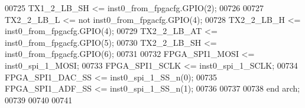 \begin{DoxyCode}
00725    \textcolor{vhdlchar}{TX1_2_LB_SH}       \textcolor{vhdlchar}{<=} \textcolor{vhdlchar}{inst0_from_fpgacfg}\textcolor{vhdlchar}{.}\textcolor{vhdlchar}{GPIO}\textcolor{vhdlchar}{(}\textcolor{vhdllogic}{}\textcolor{vhdllogic}{2}\textcolor{vhdlchar}{)};
00726    
00727    \textcolor{vhdlchar}{TX2_2_LB_L}        \textcolor{vhdlchar}{<=} \textcolor{keywordflow}{not} \textcolor{vhdlchar}{inst0_from_fpgacfg}\textcolor{vhdlchar}{.}\textcolor{vhdlchar}{GPIO}\textcolor{vhdlchar}{(}\textcolor{vhdllogic}{}\textcolor{vhdllogic}{4}\textcolor{vhdlchar}{)};
00728    \textcolor{vhdlchar}{TX2_2_LB_H}        \textcolor{vhdlchar}{<=} \textcolor{vhdlchar}{inst0_from_fpgacfg}\textcolor{vhdlchar}{.}\textcolor{vhdlchar}{GPIO}\textcolor{vhdlchar}{(}\textcolor{vhdllogic}{}\textcolor{vhdllogic}{4}\textcolor{vhdlchar}{)};
00729    \textcolor{vhdlchar}{TX2_2_LB_AT}       \textcolor{vhdlchar}{<=} \textcolor{vhdlchar}{inst0_from_fpgacfg}\textcolor{vhdlchar}{.}\textcolor{vhdlchar}{GPIO}\textcolor{vhdlchar}{(}\textcolor{vhdllogic}{}\textcolor{vhdllogic}{5}\textcolor{vhdlchar}{)};
00730    \textcolor{vhdlchar}{TX2_2_LB_SH}       \textcolor{vhdlchar}{<=} \textcolor{vhdlchar}{inst0_from_fpgacfg}\textcolor{vhdlchar}{.}\textcolor{vhdlchar}{GPIO}\textcolor{vhdlchar}{(}\textcolor{vhdllogic}{}\textcolor{vhdllogic}{6}\textcolor{vhdlchar}{)};
00731    
00732    \textcolor{vhdlchar}{FPGA_SPI1_MOSI}    \textcolor{vhdlchar}{<=} \textcolor{vhdlchar}{inst0_spi_1_MOSI};
00733    \textcolor{vhdlchar}{FPGA_SPI1_SCLK}    \textcolor{vhdlchar}{<=} \textcolor{vhdlchar}{inst0_spi_1_SCLK};
00734    \textcolor{vhdlchar}{FPGA_SPI1_DAC_SS}  \textcolor{vhdlchar}{<=} \textcolor{vhdlchar}{inst0_spi_1_SS_n}\textcolor{vhdlchar}{(}\textcolor{vhdllogic}{}\textcolor{vhdllogic}{0}\textcolor{vhdlchar}{)};
00735    \textcolor{vhdlchar}{FPGA_SPI1_ADF_SS}  \textcolor{vhdlchar}{<=} \textcolor{vhdlchar}{inst0_spi_1_SS_n}\textcolor{vhdlchar}{(}\textcolor{vhdllogic}{}\textcolor{vhdllogic}{1}\textcolor{vhdlchar}{)};
00736 
00737 
00738 \textcolor{keywordflow}{end} \textcolor{vhdlchar}{arch};   
00739 
00740 
00741 
\end{DoxyCode}
